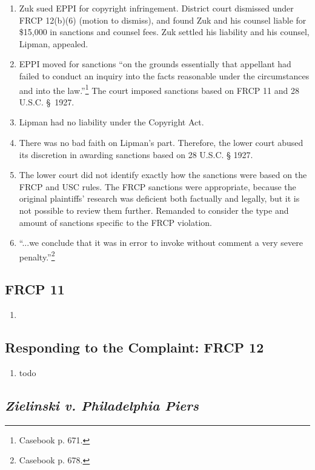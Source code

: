 \begin{enumerate}
    \item Zuk sued EPPI for copyright infringement. District court dismissed under FRCP 12(b)(6) (motion to dismiss), and found Zuk and his counsel liable for \$15,000 in sanctions and counsel fees. Zuk settled his liability and his counsel, Lipman, appealed.
    \item EPPI moved for sanctions ``on the grounds essentially that appellant had failed to conduct an inquiry into the facts reasonable under the circumstances and into the law.''\footnote{Casebook p. 671.} The court imposed sanctions based on FRCP 11 and 28 U.S.C. § 1927.
    \item Lipman had no liability under the Copyright Act.
    \item There was no bad faith on Lipman's part. Therefore, the lower court abused its discretion in awarding sanctions based on 28 U.S.C. § 1927.
    \item The lower court did not identify exactly how the sanctions were based on the FRCP and USC rules. The FRCP sanctions were appropriate, because the original plaintiffs' research was deficient both factually and legally, but it is not possible to review them further. Remanded to consider the type and amount of sanctions specific to the FRCP violation.
    \item ``...we conclude that it was in error to invoke without comment a very severe penalty.''\footnote{Casebook p. 678.}
\end{enumerate}

\subsection{FRCP 11}

\begin{enumerate}
    \item 
\end{enumerate}

\subsection{Responding to the Complaint: FRCP 12}

\begin{enumerate}
    \item todo
\end{enumerate}

\subsection{\emph{Zielinski v. Philadelphia Piers}}

